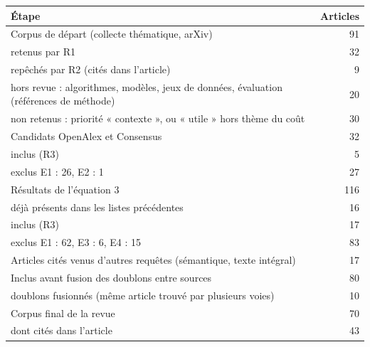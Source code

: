 \begin{tabular}{@{}p{10.4cm}r@{}}
\toprule
Étape & Articles\\
\midrule
Corpus de départ (collecte thématique, arXiv) & 91\\
\quad retenus par R1 & 32\\
\quad repêchés par R2 (cités dans l'article) & 9\\
\quad hors revue : algorithmes, modèles, jeux de données, évaluation (références de méthode) & 20\\
\quad non retenus : priorité « contexte », ou « utile » hors thème du coût & 30\\
Candidats OpenAlex et Consensus & 32\\
\quad inclus (R3) & 5\\
\quad exclus E1 : 26, E2 : 1 & 27\\
Résultats de l'équation 3 & 116\\
\quad déjà présents dans les listes précédentes & 16\\
\quad inclus (R3) & 17\\
\quad exclus E1 : 62, E3 : 6, E4 : 15 & 83\\
Articles cités venus d'autres requêtes (sémantique, texte intégral) & 17\\
Inclus avant fusion des doublons entre sources & 80\\
\quad doublons fusionnés (même article trouvé par plusieurs voies) & 10\\
\midrule
Corpus final de la revue & 70\\
\quad dont cités dans l'article & 43\\
\bottomrule
\end{tabular}
